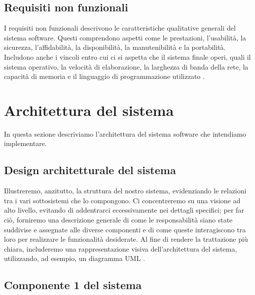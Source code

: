 \subsection{Requisiti non funzionali}

I requisiti non funzionali descrivono le caratteristiche qualitative generali del sistema software. Questi comprendono aspetti come le prestazioni, l'usabilità, la sicurezza, l'affidabilità, la disponibilità, la manutenibilità e la portabilità. Includono anche i vincoli entro cui ci si aspetta che il sistema finale operi, quali il sistema operativo, la velocità di elaborazione, la larghezza di banda della rete, la capacità di memoria e il linguaggio di programmazione utilizzato \cite{wah2009pedia}.

\section{Architettura del sistema}

In questa sezione descriviamo l'architettura del sistema software che intendiamo implementare.

\subsection{Design architetturale del sistema}

Illustreremo, anzitutto, la struttura del nostro sistema, evidenziando le relazioni tra i vari sottosistemi che lo compongono. Ci concentreremo su una visione ad alto livello, evitando di addentrarci eccessivamente nei dettagli specifici;  per far ciò, forniremo una descrizione generale di come le responsabilità siano state suddivise e assegnate alle diverse componenti e di come queste interagiscono tra loro per realizzare le funzionalità desiderate. Al fine di rendere la trattazione più chiara, includeremo una rappresentazione visiva dell'architettura del sistema, utilizzando, ad esempio, un diagramma UML \cite{harran2023design}.

\subsection{Componente 1 del sistema}

